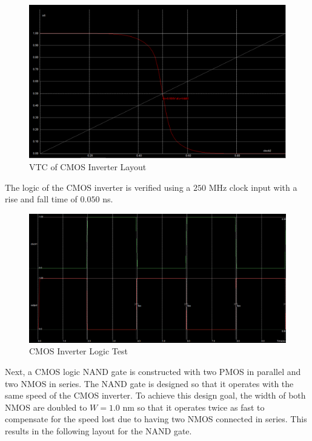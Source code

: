 \begin{figure}[h!]
	\centering
	\includegraphics[scale=0.30]{../images/inverter_layout_vtc.PNG}
	\caption{VTC of CMOS Inverter Layout}
	\label{fig:inverter_layout_vtc}
\end{figure}

\FloatBarrier

The logic of the CMOS inverter is verified using a $250$ \si{\mega\hertz} clock input with a rise and fall time of $0.050$ \si{\nano\second}.

\FloatBarrier

\begin{figure}[h!]
	\centering
	\includegraphics[scale=0.30]{../images/inverter_logic_test.PNG}
	\caption{CMOS Inverter Logic Test}
	\label{fig:inverter_layout_logic}
\end{figure}

\FloatBarrier

Next, a CMOS logic NAND gate is constructed with two PMOS in parallel and two NMOS in series.
The NAND gate is designed so that it operates with the same speed of the CMOS inverter.
To achieve this design goal, the width of both NMOS are doubled to $W = 1.0$ \si{\nano\meter} so that it operates twice as fast to compensate for the speed lost due to having two NMOS connected in series.
This results in the following layout for the NAND gate.

